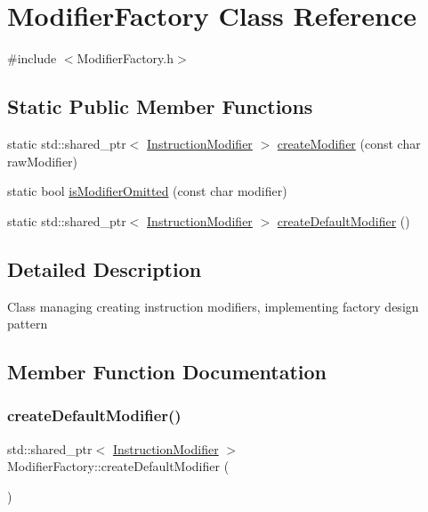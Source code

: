 \hypertarget{classModifierFactory}{}\section{Modifier\+Factory Class Reference}
\label{classModifierFactory}


{\ttfamily \#include $<$Modifier\+Factory.\+h$>$}

\subsection*{Static Public Member Functions}
\begin{DoxyCompactItemize}
\item 
static std\+::shared\+\_\+ptr$<$ \hyperlink{classInstructionModifier}{Instruction\+Modifier} $>$ \hyperlink{classModifierFactory_a2c5bcf63ebfe5acd617783ffb6468ec7}{create\+Modifier} (const char raw\+Modifier)
\item 
static bool \hyperlink{classModifierFactory_a44341cfff086fc453d24fe5d01c8bfa6}{is\+Modifier\+Omitted} (const char modifier)
\item 
static std\+::shared\+\_\+ptr$<$ \hyperlink{classInstructionModifier}{Instruction\+Modifier} $>$ \hyperlink{classModifierFactory_af215ef0d0aa2e9e4860148fecfe952f8}{create\+Default\+Modifier} ()
\end{DoxyCompactItemize}


\subsection{Detailed Description}
Class managing creating instruction modifiers, implementing factory design pattern 

\subsection{Member Function Documentation}
\mbox{\label{classModifierFactory_af215ef0d0aa2e9e4860148fecfe952f8}} 
\subsubsection{\texorpdfstring{create\+Default\+Modifier()}{createDefaultModifier()}}
{\footnotesize\ttfamily std\+::shared\+\_\+ptr$<$ \hyperlink{classInstructionModifier}{Instruction\+Modifier} $>$ Modifier\+Factory\+::create\+Default\+Modifier (\begin{DoxyParamCaption}{ }\end{DoxyParamCaption})\hspace{0.3cm}{\ttfamily [static]}}

